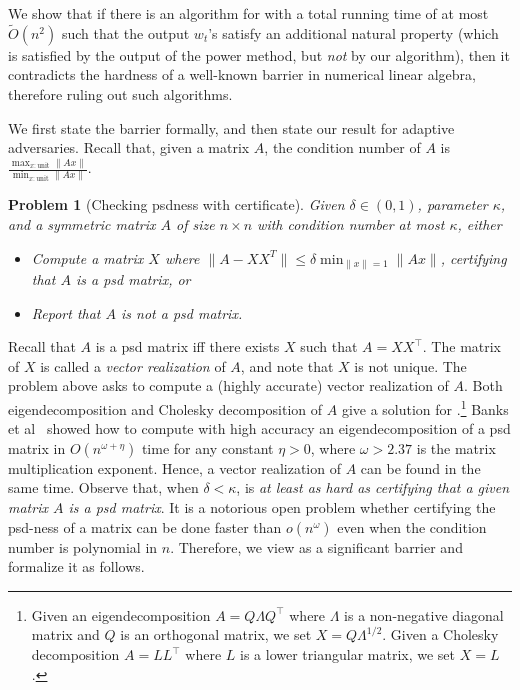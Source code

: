 \documentclass[11pt]{article}
\newtheorem{problem}[theorem]{Problem}
\newcommand\ww{\boldsymbol{\mathit{w}}}
\newcommand\xx{\boldsymbol{\mathit{x}}}
\renewcommand\AA{\boldsymbol{\mathit{A}}}
\newcommand\LL{\boldsymbol{\mathit{L}}}
\newcommand\QQ{\boldsymbol{\mathit{Q}}}
\newcommand\XX{\boldsymbol{\mathit{X}}}
\newcommand\Otil{\widetilde{O}}
\begin{document}
 We show that if there is an algorithm for  with a total running time of at most $\Otil(n^2)$ such that the output $\ww_t$'s satisfy an additional natural property (which is satisfied by the output of the power method, but \emph{not} by our algorithm), then it contradicts the hardness of a well-known barrier in numerical linear algebra, therefore ruling out such algorithms.
 
 We first state the barrier formally, and then state our result for adaptive adversaries.
Recall that, given a matrix $\AA$, the condition number of $\AA$ is $\frac{\max_{x:\textrm{unit}}\|\AA\xx\|}{\min_{x:\textrm{unit}}\|\AA\xx\|}$.

\begin{problem}[Checking psdness with certificate]\label{prob:factor}Given $\delta\in(0,1)$, parameter $\kappa$, and a symmetric matrix $\AA$ of size $n\times n$ with condition number at most $\kappa$, either 
	\begin{itemize}
		\item Compute a matrix $\XX$ where $\|\AA-\XX\XX^{T}\|\le\delta\min_{\|\xx\|=1}\|\AA\xx\|$, certifying that $\AA$ is a psd matrix, or
		\item Report that $\AA$ is not a psd matrix.
	\end{itemize}
\end{problem}

Recall that $A$ is a psd matrix iff there exists $\XX$ such that $\AA=\XX\XX^{\top}$. The matrix of $\XX$ is called a \emph{vector realization} of $\AA$, and note that $\XX$ is not unique. The problem above asks to compute a (highly accurate) vector realization of $\AA$. Both eigendecomposition and Cholesky decomposition of $\AA$ give a solution for .\footnote{Given an eigendecomposition $\AA=\QQ\Lambda \QQ^{\top}$ where $\Lambda$ is a non-negative diagonal matrix and $\QQ$ is an orthogonal matrix, we set $\XX=\QQ\Lambda^{1/2}$. Given a Cholesky decomposition $\AA=\LL\LL^{\top}$ where $\LL$ is a lower triangular matrix, we set $\XX=\LL$.} Banks et al~\cite{banks2022pseudospectral} showed how to compute with high accuracy an eigendecomposition of a psd matrix in $O(n^{\omega+\eta})$ time for any constant $\eta>0$, where $\omega > 2.37$ is the matrix multiplication exponent. Hence, a vector realization of $\AA$ can be found in the same time. Observe that, when $\delta < \kappa$,  is \emph{at least as hard as certifying that a given matrix $\AA$ is a psd matrix}.
It is a notorious open problem whether certifying the psd-ness of a matrix can be done faster than $o(n^\omega)$ even when the condition number is polynomial in $n$.
Therefore, we view  as a significant barrier and formalize it as follows.
\end{document}

